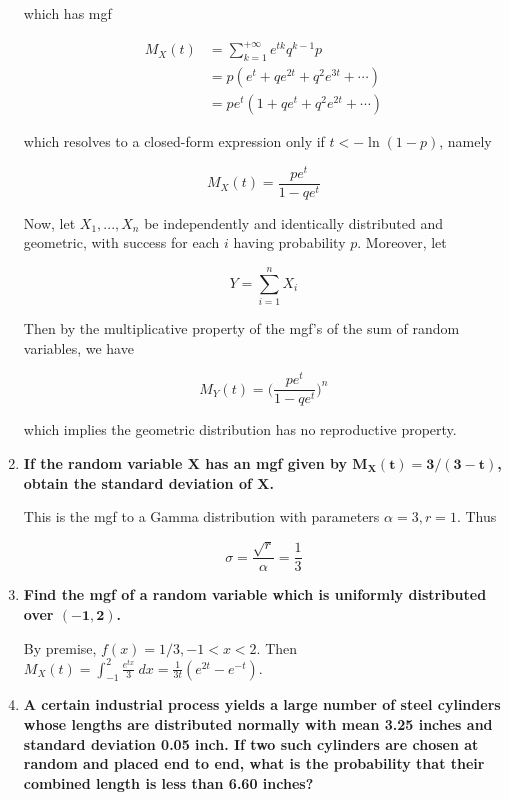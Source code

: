 \documentclass[10pt, oneside]{article}   	%
\theoremstyle{definition}
\begin{document}
\begin{enumerate}[label=10.\arabic*]
which has mgf

\begin{align*}
M_X(t) &= \sum^{+\infty}_{k=1} e^{tk} q^{k-1} p \\
&= p(e^t + qe^{2t} + q^2 e^{3t} + \cdots) \\
&= pe^t (1 + qe^t + q^2 e^{2t} + \cdots)
\end{align*}

which resolves to a closed-form expression only if $t < -\ln(1-p)$, namely

\[ \boxed{ M_X(t) = \frac{pe^t}{1-qe^t} } \]

Now, let $X_1, ..., X_n$ be independently and identically distributed and geometric, with success for each $i$ having probability $p$. Moreover, let

\[ Y = \sum^n_{i=1} X_i \]

Then by the multiplicative property of the mgf's of the sum of random variables, we have

\[ M_Y(t) = \bigg( \frac{pe^t}{1-qe^t} \bigg)^n \]

which implies the geometric distribution has no reproductive property.

\item  \begin{tcolorbox}[
  colback=Cerulean!5!white,
  colframe=Cerulean!75!black]
\textbf{If the random variable $\bm{X}$ has an mgf given by $\bm{M_X(t) = 3/(3-t)}$, obtain the standard deviation of $\bm{X}$.}
\end{tcolorbox}

This is the mgf to a Gamma distribution with parameters $\alpha = 3, r = 1$. Thus

\[ \sigma = \frac{\sqrt{r}}{\alpha} = \boxed{\frac{1}{3}} \]

\item  \begin{tcolorbox}[
  colback=Cerulean!5!white,
  colframe=Cerulean!75!black]
\textbf{Find the mgf of a random variable which is uniformly distributed over $\bm{(-1,2)}$.}
\end{tcolorbox}

By premise, $f(x) = 1/3, -1 < x < 2$. Then $M_X(t) = \int^2_{-1} \frac{e^{tx}}{3} \ dx = \boxed{\frac{1}{3t}(e^{2t} - e^{-t})}$.

\item  \begin{tcolorbox}[
  colback=Cerulean!5!white,
  colframe=Cerulean!75!black]
\textbf{A certain industrial process yields a large number of steel cylinders whose lengths are distributed normally with mean 3.25 inches and standard deviation 0.05 inch. If two such cylinders are chosen at random and placed end to end, what is the probability that their combined length is less than 6.60 inches?}
\end{tcolorbox}


\end{enumerate}
\end{document}
